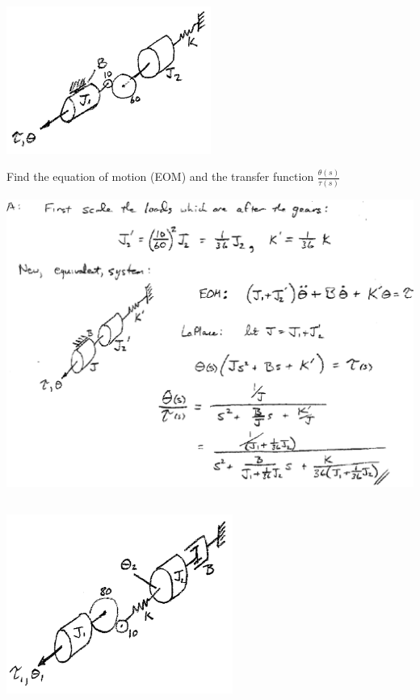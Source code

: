 \documentclass{article}	%
\begin{document}


\subsection{}\label{2mass10to60}

\includegraphics[width=67mm]{00462a.png}

Find the equation of motion (EOM) and the transfer function $\frac{\theta(s)}{\tau(s)}$


\begin{solution}
\includegraphics[width=6.25in]{00945a.png}
\end{solution}



\subsection{}
\includegraphics[width=74mm]{00463a.png}
\end{document}
